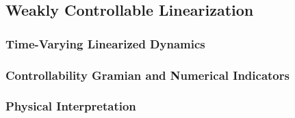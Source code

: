 \subsection{Weakly Controllable Linearization}
\label{subsec:weak_controllability}


\subsubsection{Time-Varying Linearized Dynamics}
\label{subsubsec:weak_ltv_dynamics}


\subsubsection{Controllability Gramian and Numerical Indicators}
\label{subsubsec:weak_gramian}


\subsubsection{Physical Interpretation}
\label{subsubsec:weak_physical_interpretation}

